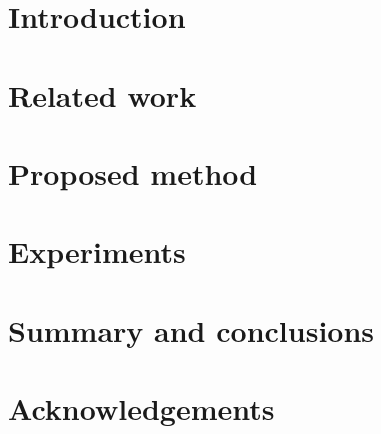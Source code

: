 \documentclass[10pt,twocolumn,letterpaper]{article}
\begin{document}




\section{Introduction}
\label{sec:introduction}


\section{Related work}
\label{sec:related_work}


\section{Proposed method}
\label{sec:methods}


\section{Experiments}
\label{sec:experiments}


\section{Summary and conclusions}
\label{sec:conclusions}


\section*{Acknowledgements}
\label{sec:acknowledgements}



\clearpage
{\small


}
\end{document}
